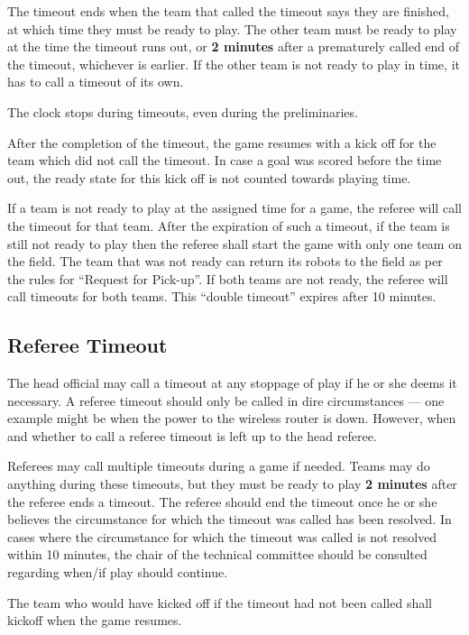 \documentclass[12pt]{article}
\begin{document}
The timeout ends when the team that called the timeout says they are finished, at which time they must be ready to play. The other team must be ready to play at the time the timeout runs out, or \textbf{2 minutes} after a prematurely called end of the timeout, whichever is earlier. If the other team is not ready to play in time, it has to call a timeout of its own.
  
The clock stops during timeouts, even during the preliminaries.

After the completion of the timeout, the game resumes with a kick off for the team which did not call the timeout. In case a goal was scored before the time out, the ready state for this kick off is not counted towards playing time.

If a team is not ready to play at the assigned time for a game, the referee will call the timeout for that team. After the expiration of such a timeout, if the team is still not ready to play then the referee shall start the game with only one team on the field.  The team that was not ready can return its robots to the field as per the rules for ``Request for Pick-up''. If both teams are not ready, the referee will call timeouts for both teams. This ``double timeout'' expires after 10 minutes.

\subsection{Referee Timeout}
\label{sec:referee_timeout}
The head official may call a timeout at any stoppage of play if he or she deems it necessary.  A referee timeout should only be called in dire circumstances --- one example might be when the power to the wireless router is down.  However, when and whether to call a referee timeout is left up to the head referee.

Referees may call multiple timeouts during a game if needed.  Teams may do anything during these timeouts, but they must be ready to play \textbf{2 minutes} after the referee ends a timeout.  The referee should end the timeout once he or she believes the circumstance for which the timeout was called has been resolved.  In cases where the circumstance for which the timeout was called is not resolved within 10 minutes, the chair of the technical committee should be consulted regarding when/if play should continue.

The team who would have kicked off if the timeout had not been called shall kickoff when the game resumes.
\end{document}
